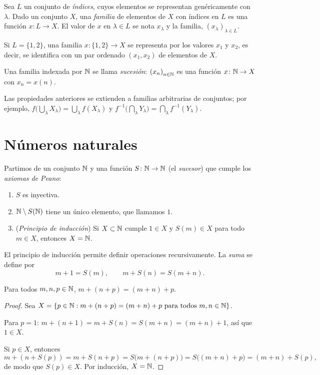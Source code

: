 Sea \(L\) un conjunto de \emph{índices}, cuyos elementos se representan genéricamente con \(\lambda\). Dado un conjunto \(X\), una \emph{familia} de elementos de \(X\) con índices en \(L\) es una función \(x\colon L \to X\). El valor de \(x\) en \(\lambda \in L\) se nota \(x_\lambda\) y la familia, \({(x_\lambda)}_{\lambda \in L}\).

\begin{eg}
  Si \(L = \{1, 2\}\), una familia \(x\colon \{1, 2\} \to X\) se representa por los valores \(x_1\) y \(x_2\), es decir, se identifica con un par ordenado \((x_1, x_2)\) de elementos de \(X\).
\end{eg}

Una familia indexada por \(\mathbb{N}\) se llama \emph{sucesión}: \({(x_n)}_{n \in \mathbb{N}}\) es una función \(x\colon \mathbb{N} \to X\) con \(x_n = x(n)\).

Las propiedades anteriores se extienden a familias arbitrarias de conjuntos; por ejemplo, \(f\bigl(\bigcup_\lambda X_\lambda\bigr) = \bigcup_\lambda f(X_\lambda)\) y \(f^{-1}\bigl(\bigcap_\lambda Y_\lambda\bigr) = \bigcap_\lambda f^{-1}(Y_\lambda)\).

\section{Números naturales}

Partimos de un conjunto \(\mathbb{N}\) y una función \(S\colon \mathbb{N} \to \mathbb{N}\) (el \emph{sucesor}) que cumple los \emph{axiomas de Peano}:
\begin{enumerate}[label=(\arabic*)]
  \item \(S\) es inyectiva.
  \item \(\mathbb{N} \setminus S(\mathbb{N})\) tiene un único elemento, que llamamos \(1\).
  \item (\emph{Principio de inducción}) Si \(X \subset \mathbb{N}\) cumple \(1 \in X\) y \(S(m) \in X\) para todo \(m \in X\), entonces \(X = \mathbb{N}\).
\end{enumerate}

El principio de inducción permite definir operaciones recursivamente. La \emph{suma} se define por
\[
  m + 1 = S(m), \qquad m + S(n) = S(m + n).
\]

\begin{prop}[Asociatividad]
  Para todos \(m, n, p \in \mathbb{N}\), \(m + (n + p) = (m + n) + p\).
\end{prop}

\begin{proof}
  Sea \(X = \{ p \in \mathbb{N} : m + (n + p) = (m + n) + p \text{ para todos } m, n \in \mathbb{N} \}\).

  Para \(p = 1\): \(m + (n + 1) = m + S(n) = S(m + n) = (m + n) + 1\), así que \(1 \in X\).

  Si \(p \in X\), entonces
  \[
    m + (n + S(p)) = m + S(n + p) = S\bigl(m + (n + p)\bigr) = S\bigl((m + n) + p\bigr) = (m + n) + S(p),
  \]
  de modo que \(S(p) \in X\). Por inducción, \(X = \mathbb{N}\).
\end{proof}

